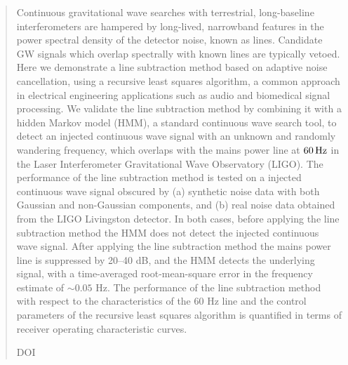 \documentclass[pra,superscriptaddress,reprint,amsmath,amssymb,nofootinbib]{revtex4-2}
\begin{document}
\begin{abstract}
		Continuous gravitational wave searches with terrestrial, long-baseline interferometers are hampered by long-lived, narrowband features in the power spectral density of the detector noise, known as lines. Candidate GW signals which overlap spectrally with known lines are typically vetoed. Here we demonstrate a line subtraction method based on adaptive noise cancellation, using a recursive least squares algorithm, a common approach in electrical engineering applications such as audio and biomedical signal processing. We validate the line subtraction method by combining it with a hidden Markov model (HMM), a standard continuous wave search tool, to detect an injected continuous wave signal with an unknown and randomly wandering frequency, which overlaps with the mains power line at $60 \, {\rm Hz}$ in the Laser Interferometer Gravitational Wave Observatory (LIGO). The performance of the line subtraction method is tested on a injected continuous wave signal obscured by (a) synthetic noise data with both Gaussian and non-Gaussian components, and (b) real noise data obtained from the LIGO Livingston detector. In both cases, before applying the line subtraction method the HMM does not detect the injected continuous wave signal. After applying the line subtraction method the mains power line is suppressed by 20--40 dB, and the HMM detects the underlying signal, with a time-averaged root-mean-square error in the frequency estimate of $\sim 0.05 $ Hz. The performance of the line subtraction method with respect to the characteristics of the 60 Hz line and the control parameters of the recursive least squares algorithm is quantified in terms of receiver operating characteristic curves.
		
		

\begin{description}
\item[DOI]
\end{description}
\end{abstract}



\maketitle	
\end{document}

